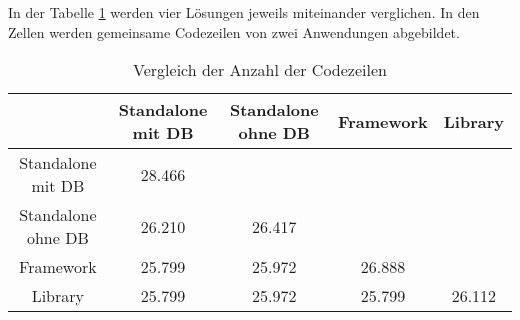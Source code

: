 In der Tabelle \ref{tab:compareLoC} werden vier Lösungen jeweils miteinander verglichen.
In den Zellen werden gemeinsame Codezeilen von zwei Anwendungen abgebildet.

\begin{table}[h!]
    \centering
    \begin{tabular}{|c|c| c| c| c| }
    \hline
                        & Standalone mit DB & Standalone ohne DB    & Framework & Library \\ 
    \hline
    Standalone mit DB   & 28.466             &                       &           & \\  
    \hline
    Standalone ohne DB  & 26.210             & 26.417                 &           & \\  
    \hline
    Framework           & 25.799             & 25.972                 & 26.888     & \\  
    \hline
    Library             & 25.799             & 25.972                 & 25.799     & 26.112 \\
    \hline
    \end{tabular}
    \caption{Vergleich der Anzahl der Codezeilen}
    \label{tab:compareLoC}
\end{table}